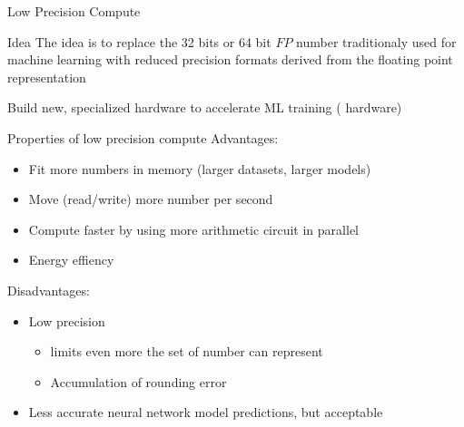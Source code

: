 \begin{parag}{Low Precision Compute}
    \begin{subparag}{Idea}
        The idea is to replace the 32 bits or 64 bit $FP$ number traditionaly used for machine learning with reduced precision formats derived from the floating point representation
    \end{subparag}
    Build new, specialized hardware to accelerate ML training (  hardware)
\end{parag}
\begin{parag}{Properties of low precision compute}
    Advantages:
    \begin{itemize}
        \item Fit more numbers in memory (larger datasets, larger models)
        \item Move (read/write) more number per second
        \item Compute faster by using more arithmetic circuit in parallel 
        \item Energy effiency
    \end{itemize}
    Disadvantages:
    \begin{itemize}
        \item Low precision
            \begin{itemize}
                \item limits even more the set of number can represent
                \item Accumulation of rounding error
            \end{itemize}
        \item Less accurate neural network model predictions, but acceptable
    \end{itemize}

\end{parag}

